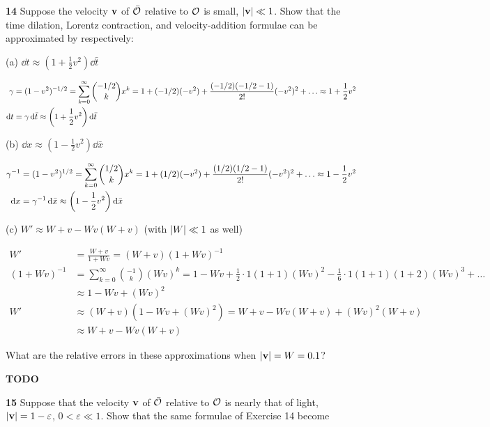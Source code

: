 \documentclass[gr-notes.tex]{subfiles}
\begin{document}
\textbf{14}
Suppose the velocity $\vb{v}$ of $\bar{\mathcal{O}}$ relative to $\mathcal{O}$ is small, $\abs{\vb{v}} \ll 1$. Show that the time dilation, Lorentz contraction, and velocity-addition formulae can be approximated by respectively:

(a) $\dd{t} \approx (1 + \frac{1}{2} v^2) \dd{\bar{t}}$

\begin{align*}
  \gamma &=
  (1 - v^2)^{-1/2} =
  \sum_{k=0}^\infty \binom{-1/2}{k} x^k =
  1 + (-1/2) (-v^2) + \frac{(-1/2) (-1/2 - 1)}{2!} (-v^2)^2 + \ldots \approx
  1 + \frac{1}{2} v^2
  \\
  \dd{t} &=
  \gamma \dd{\bar{t}} \approx
  \qty(1 + \frac{1}{2} v^2) \dd{\bar{t}}
\end{align*}

(b) $\dd{x} \approx (1 - \frac{1}{2} v^2) \dd{\bar{x}}$

\begin{align*}
  \gamma^{-1} &=
  (1 - v^2)^{1/2} =
  \sum_{k=0}^\infty \binom{1/2}{k} x^k =
  1 + (1/2) (-v^2) + \frac{(1/2) (1/2 - 1)}{2!} (-v^2)^2 + \ldots \approx
  1 - \frac{1}{2} v^2
  \\
  \dd{x} &=
  \gamma^{-1} \dd{\bar{x}} \approx
  \qty(1 - \frac{1}{2} v^2) \dd{\bar{x}}
\end{align*}


(c) $W' \approx W + v - W v (W + v)$ (with $\abs{W} \ll 1$ as well)

\begin{align*}
  W' &=
  \frac{W + v}{1 + W v} =
  (W + v) (1 + W v)^{-1}
  \\
  (1 + W v)^{-1} &=
  \sum_{k=0}^\infty \binom{-1}{k} (W v)^k =
  1 -
  W v +
  \frac{1}{2} \cdot 1 (1 + 1) (W v)^2 -
  \frac{1}{6} \cdot 1 (1 + 1) (1 + 2) (W v)^3 + \ldots
  \\ &\approx
  1 - W v + (W v)^2
  \\
  W' &\approx
  (W + v) (1 - W v + (W v)^2) =
  W + v - W v (W + v) + (W v)^2 (W + v)
  \\ &\approx
  W + v - W v (W + v)
\end{align*}

What are the relative errors in these approximations when $\abs{\vb{v}} = W = 0.1$?

\textbf{TODO}


\textbf{15}
Suppose that the velocity $\vb{v}$ of $\bar{\mathcal{O}}$ relative to $\mathcal{O}$ is nearly that of light, $\abs{\vb{v}} = 1 - \varepsilon$, $0 < \varepsilon \ll 1$. Show that the same formulae of Exercise 14 become
\end{document}
